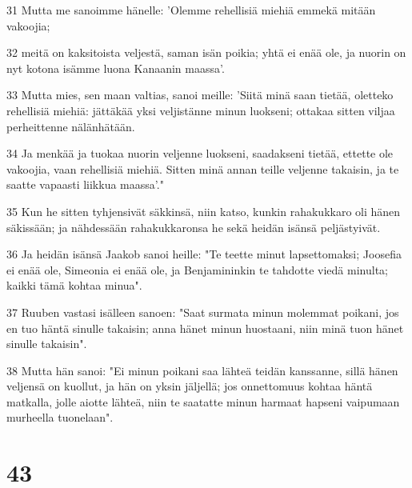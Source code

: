 \par 31 Mutta me sanoimme hänelle: 'Olemme rehellisiä miehiä emmekä mitään vakoojia;
\par 32 meitä on kaksitoista veljestä, saman isän poikia; yhtä ei enää ole, ja nuorin on nyt kotona isämme luona Kanaanin maassa'.
\par 33 Mutta mies, sen maan valtias, sanoi meille: 'Siitä minä saan tietää, oletteko rehellisiä miehiä: jättäkää yksi veljistänne minun luokseni; ottakaa sitten viljaa perheittenne nälänhätään.
\par 34 Ja menkää ja tuokaa nuorin veljenne luokseni, saadakseni tietää, ettette ole vakoojia, vaan rehellisiä miehiä. Sitten minä annan teille veljenne takaisin, ja te saatte vapaasti liikkua maassa'."
\par 35 Kun he sitten tyhjensivät säkkinsä, niin katso, kunkin rahakukkaro oli hänen säkissään; ja nähdessään rahakukkaronsa he sekä heidän isänsä peljästyivät.
\par 36 Ja heidän isänsä Jaakob sanoi heille: "Te teette minut lapsettomaksi; Joosefia ei enää ole, Simeonia ei enää ole, ja Benjamininkin te tahdotte viedä minulta; kaikki tämä kohtaa minua".
\par 37 Ruuben vastasi isälleen sanoen: "Saat surmata minun molemmat poikani, jos en tuo häntä sinulle takaisin; anna hänet minun huostaani, niin minä tuon hänet sinulle takaisin".
\par 38 Mutta hän sanoi: "Ei minun poikani saa lähteä teidän kanssanne, sillä hänen veljensä on kuollut, ja hän on yksin jäljellä; jos onnettomuus kohtaa häntä matkalla, jolle aiotte lähteä, niin te saatatte minun harmaat hapseni vaipumaan murheella tuonelaan".

\chapter{43}

